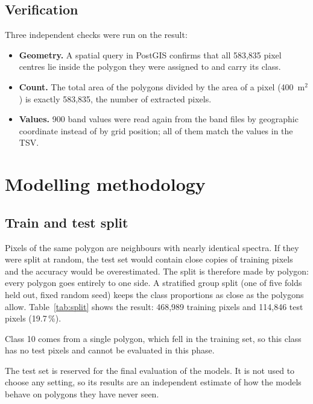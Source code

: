 \documentclass[11pt,a4paper]{article}
\begin{document}
\subsection{Verification}

Three independent checks were run on the result:

\begin{itemize}
  \item \textbf{Geometry.} A spatial query in PostGIS confirms that all
  583,835 pixel centres lie inside the polygon they were assigned to and carry
  its class.
  \item \textbf{Count.} The total area of the polygons divided by the area of a
  pixel (400~m$^2$) is exactly 583,835, the number of extracted pixels.
  \item \textbf{Values.} 900 band values were read again from the band files by
  geographic coordinate instead of by grid position; all of them match the
  values in the TSV.
\end{itemize}

\section{Modelling methodology}

\subsection{Train and test split}

Pixels of the same polygon are neighbours with nearly identical spectra. If
they were split at random, the test set would contain close copies of training
pixels and the accuracy would be overestimated. The split is therefore made by
polygon: every polygon goes entirely to one side. A stratified group split
(one of five folds held out, fixed random seed) keeps the class proportions as
close as the polygons allow. Table~\ref{tab:split} shows the result: 468,989
training pixels and 114,846 test pixels (19.7\,\%).

\begin{table}[H]
\centering\small
\caption{Train and test split by polygon.}
\label{tab:split}

\end{table}

Class 10 comes from a single polygon, which fell in the training set, so this
class has no test pixels and cannot be evaluated in this phase.

The test set is reserved for the final evaluation of the models. It is not
used to choose any setting, so its results are an independent estimate of how
the models behave on polygons they have never seen.
\end{document}
